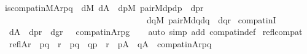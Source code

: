 \begin{isabellebody}
\ \ {\isachardoublequoteopen}is{\isacharunderscore}{\kern0pt}compat{\isacharunderscore}{\kern0pt}in{\isacharparenleft}{\kern0pt}M{\isacharcomma}{\kern0pt}A{\isacharcomma}{\kern0pt}r{\isacharcomma}{\kern0pt}p{\isacharcomma}{\kern0pt}q{\isacharparenright}{\kern0pt}\ {\isasymequiv}\ {\isasymexists}d{\isacharbrackleft}{\kern0pt}M{\isacharbrackright}{\kern0pt}{\isachardot}{\kern0pt}\ d{\isasymin}A\ {\isasymand}\ {\isacharparenleft}{\kern0pt}{\isasymexists}dp{\isacharbrackleft}{\kern0pt}M{\isacharbrackright}{\kern0pt}{\isachardot}{\kern0pt}\ pair{\isacharparenleft}{\kern0pt}M{\isacharcomma}{\kern0pt}d{\isacharcomma}{\kern0pt}p{\isacharcomma}{\kern0pt}dp{\isacharparenright}{\kern0pt}\ {\isasymand}\ dp{\isasymin}r\ {\isasymand}\ \isanewline
\ \ \ \ \ \ \ \ \ \ \ \ \ \ \ \ \ \ \ \ \ \ \ \ \ \ \ \ \ \ \ \ \ \ \ {\isacharparenleft}{\kern0pt}{\isasymexists}dq{\isacharbrackleft}{\kern0pt}M{\isacharbrackright}{\kern0pt}{\isachardot}{\kern0pt}\ pair{\isacharparenleft}{\kern0pt}M{\isacharcomma}{\kern0pt}d{\isacharcomma}{\kern0pt}q{\isacharcomma}{\kern0pt}dq{\isacharparenright}{\kern0pt}\ {\isasymand}\ dq{\isasymin}r{\isacharparenright}{\kern0pt}{\isacharparenright}{\kern0pt}{\isachardoublequoteclose}\isanewline
\isanewline
{}\isamarkupfalse%
\ compat{\isacharunderscore}{\kern0pt}inI\ {\isacharcolon}{\kern0pt}\ \isanewline
\ \ {\isachardoublequoteopen}{\isasymlbrakk}\ d{\isasymin}A\ {\isacharsemicolon}{\kern0pt}\ {\isasymlangle}d{\isacharcomma}{\kern0pt}p{\isasymrangle}{\isasymin}r\ {\isacharsemicolon}{\kern0pt}\ {\isasymlangle}d{\isacharcomma}{\kern0pt}g{\isasymrangle}{\isasymin}r\ {\isasymrbrakk}\ {\isasymLongrightarrow}\ compat{\isacharunderscore}{\kern0pt}in{\isacharparenleft}{\kern0pt}A{\isacharcomma}{\kern0pt}r{\isacharcomma}{\kern0pt}p{\isacharcomma}{\kern0pt}g{\isacharparenright}{\kern0pt}{\isachardoublequoteclose}\isanewline
%
\isadelimproof
\ \ %
\endisadelimproof
%
\isatagproof
{}\isamarkupfalse%
\ {\isacharparenleft}{\kern0pt}auto\ simp\ add{\isacharcolon}{\kern0pt}\ compat{\isacharunderscore}{\kern0pt}in{\isacharunderscore}{\kern0pt}def{\isacharparenright}{\kern0pt}%
\endisatagproof
{\isafoldproof}%
%
\isadelimproof
\isanewline
%
\endisadelimproof
\isanewline
{}\isamarkupfalse%
\ refl{\isacharunderscore}{\kern0pt}compat{\isacharcolon}{\kern0pt}\isanewline
\ \ {\isachardoublequoteopen}{\isasymlbrakk}\ refl{\isacharparenleft}{\kern0pt}A{\isacharcomma}{\kern0pt}r{\isacharparenright}{\kern0pt}\ {\isacharsemicolon}{\kern0pt}\ {\isasymlangle}p{\isacharcomma}{\kern0pt}q{\isasymrangle}\ {\isasymin}\ r\ {\isacharbar}{\kern0pt}\ p{\isacharequal}{\kern0pt}q\ {\isacharbar}{\kern0pt}\ {\isasymlangle}q{\isacharcomma}{\kern0pt}p{\isasymrangle}\ {\isasymin}\ r\ {\isacharsemicolon}{\kern0pt}\ p{\isasymin}A\ {\isacharsemicolon}{\kern0pt}\ q{\isasymin}A{\isasymrbrakk}\ {\isasymLongrightarrow}\ compat{\isacharunderscore}{\kern0pt}in{\isacharparenleft}{\kern0pt}A{\isacharcomma}{\kern0pt}r{\isacharcomma}{\kern0pt}p{\isacharcomma}{\kern0pt}q{\isacharparenright}{\kern0pt}{\isachardoublequoteclose}\isanewline

\end{isabellebody}
